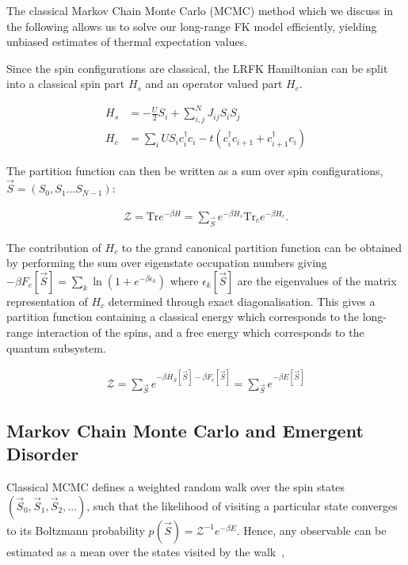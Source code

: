 The classical Markov Chain Monte Carlo (MCMC) method which we discuss in the following allows us to solve our long-range FK model efficiently, yielding unbiased estimates of thermal expectation values.

Since the spin configurations are classical, the LRFK Hamiltonian can be split into a classical spin part \(H_s\) and an operator valued part \(H_c\).

\[\begin{aligned}
H_s& = - \frac{U}{2}S_i + \sum_{i, j}^{N} J_{ij} S_i S_j \\
H_c& = \sum_i U S_i c^\dagger_{i}c_{i} -t(c^\dagger_{i}c_{i+1} + c^\dagger_{i+1}c_{i}) \end{aligned}\]

The partition function can then be written as a sum over spin configurations, \(\vec{S} = (S_0, S_1...S_{N-1})\):

\[\begin{aligned}
\mathcal{Z} = \mathrm{Tr} e^{-\beta H}= \sum_{\vec{S}} e^{-\beta H_s} \mathrm{Tr}_c e^{-\beta H_c} .\end{aligned}\]

The contribution of \(H_c\) to the grand canonical partition function can be obtained by performing the sum over eigenstate occupation numbers giving \(-\beta F_c[\vec{S}] = \sum_k \ln{(1 + e^{- \beta \epsilon_k})}\) where \({\epsilon_k[\vec{S}]}\) are the eigenvalues of the matrix representation of \(H_c\) determined through exact diagonalisation. This gives a partition function containing a classical energy which corresponds to the long-range interaction of the spins, and a free energy which corresponds to the quantum subsystem.

\[\begin{aligned}
\mathcal{Z} = \sum_{\vec{S}} e^{-\beta H_S[\vec{S}] - \beta F_c[\vec{S}]} = \sum_{\vec{S}} e^{-\beta E[\vec{S}]}\end{aligned}\]

\hypertarget{markov-chain-monte-carlo-and-emergent-disorder}{%
\subsection{Markov Chain Monte Carlo and Emergent Disorder}\label{markov-chain-monte-carlo-and-emergent-disorder}}

Classical MCMC defines a weighted random walk over the spin states \((\vec{S}_0, \vec{S}_1, \vec{S}_2, ...)\), such that the likelihood of visiting a particular state converges to its Boltzmann probability \(p(\vec{S}) = \mathcal{Z}^{-1} e^{-\beta E}\). Hence, any observable can be estimated as a mean over the states visited by the walk~\autocite{binderGuidePracticalWork1988,kerteszAdvancesComputerSimulation1998,wolffMonteCarloErrors2004},

